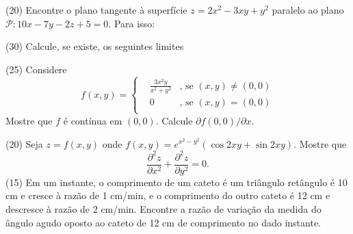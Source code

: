 \documentclass[11pt]{exam}
\begin{document}
  \begin{questions} 
   \question (20) Encontre o plano tangente à superfície 
  $z=2x^{2}-3xy+y^{2}$ paralelo ao plano $\mathcal{P}: 10x-7y-2z+5=0$.
  Para isso:
   \question (30) Calcule, se existe, os seguintes limites 
  
   \question (25) Considere 
        $$
    f(x,y)= \left\{  
            \begin{array}{lll}
    &\frac{3x^{2}y}{x^{2}+y^{2}} &\text{, se } (x, y) \neq (0,0) \\
    & 0 &\text{, se } (x ,y)=(0,0)  \\
            \end{array}
            \right. 
    $$
  Mostre que $f$ é contínua em $(0,0)$. 
  Calcule $\partial f(0,0)/\partial x$. 
      
   \question (20)
  Seja $z=f(x,y)$ onde $f(x,y)=e^{x^{2}-y^{2}}(\cos 2xy+\sin 2xy)$. Mostre que 
  $$  
  \frac{\partial^{2} z }{\partial x^2}+
  \frac{\partial^{2} z }{\partial y^2}=0. 
  $$
   \question (15) Em um instante, o comprimento de um cateto é um triângulo retângulo é 10 cm e cresce à razão de 1 cm/min, e o comprimento do outro cateto é 12 cm e descresce à razão de 2 cm/min. Encontre a razão de variação da medida do ângulo agudo oposto ao cateto de 12 cm de comprimento no dado instante.  
 \end{questions}
   
\end{document}
